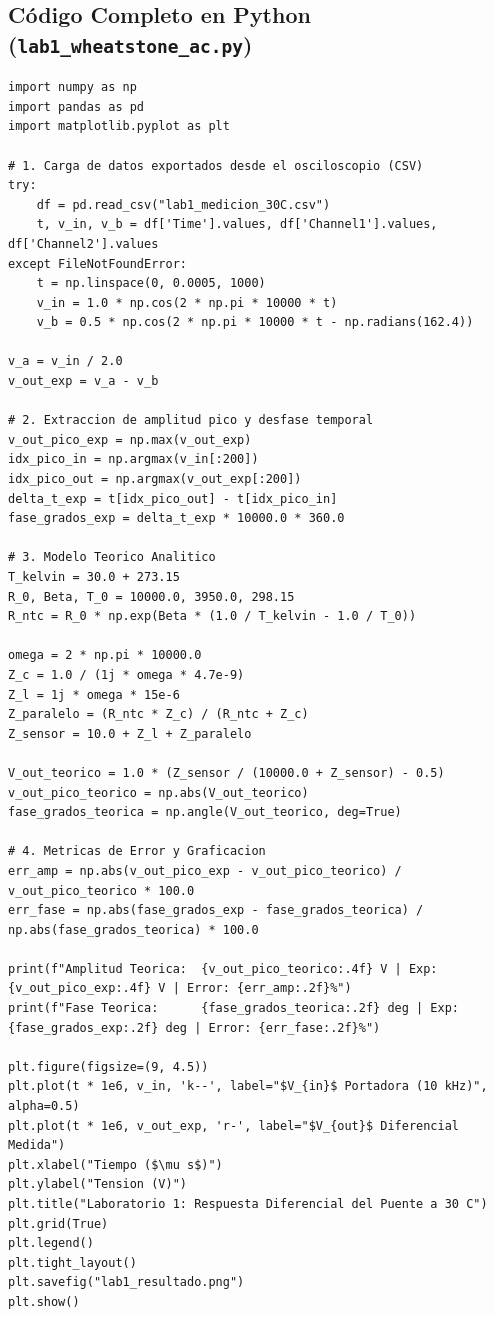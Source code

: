 \documentclass[10pt,a4paper,twoside]{article}
\begin{document}
\subsection{Código Completo en Python (\texttt{lab1\_wheatstone\_ac.py})}
\begin{lstlisting}
import numpy as np
import pandas as pd
import matplotlib.pyplot as plt

# 1. Carga de datos exportados desde el osciloscopio (CSV)
try:
    df = pd.read_csv("lab1_medicion_30C.csv")
    t, v_in, v_b = df['Time'].values, df['Channel1'].values, df['Channel2'].values
except FileNotFoundError:
    t = np.linspace(0, 0.0005, 1000)
    v_in = 1.0 * np.cos(2 * np.pi * 10000 * t)
    v_b = 0.5 * np.cos(2 * np.pi * 10000 * t - np.radians(162.4))

v_a = v_in / 2.0
v_out_exp = v_a - v_b

# 2. Extraccion de amplitud pico y desfase temporal
v_out_pico_exp = np.max(v_out_exp)
idx_pico_in = np.argmax(v_in[:200])
idx_pico_out = np.argmax(v_out_exp[:200])
delta_t_exp = t[idx_pico_out] - t[idx_pico_in]
fase_grados_exp = delta_t_exp * 10000.0 * 360.0

# 3. Modelo Teorico Analitico
T_kelvin = 30.0 + 273.15
R_0, Beta, T_0 = 10000.0, 3950.0, 298.15
R_ntc = R_0 * np.exp(Beta * (1.0 / T_kelvin - 1.0 / T_0))

omega = 2 * np.pi * 10000.0
Z_c = 1.0 / (1j * omega * 4.7e-9)
Z_l = 1j * omega * 15e-6
Z_paralelo = (R_ntc * Z_c) / (R_ntc + Z_c)
Z_sensor = 10.0 + Z_l + Z_paralelo

V_out_teorico = 1.0 * (Z_sensor / (10000.0 + Z_sensor) - 0.5)
v_out_pico_teorico = np.abs(V_out_teorico)
fase_grados_teorica = np.angle(V_out_teorico, deg=True)

# 4. Metricas de Error y Graficacion
err_amp = np.abs(v_out_pico_exp - v_out_pico_teorico) / v_out_pico_teorico * 100.0
err_fase = np.abs(fase_grados_exp - fase_grados_teorica) / np.abs(fase_grados_teorica) * 100.0

print(f"Amplitud Teorica:  {v_out_pico_teorico:.4f} V | Exp: {v_out_pico_exp:.4f} V | Error: {err_amp:.2f}%")
print(f"Fase Teorica:      {fase_grados_teorica:.2f} deg | Exp: {fase_grados_exp:.2f} deg | Error: {err_fase:.2f}%")

plt.figure(figsize=(9, 4.5))
plt.plot(t * 1e6, v_in, 'k--', label="$V_{in}$ Portadora (10 kHz)", alpha=0.5)
plt.plot(t * 1e6, v_out_exp, 'r-', label="$V_{out}$ Diferencial Medida")
plt.xlabel("Tiempo ($\mu s$)")
plt.ylabel("Tension (V)")
plt.title("Laboratorio 1: Respuesta Diferencial del Puente a 30 C")
plt.grid(True)
plt.legend()
plt.tight_layout()
plt.savefig("lab1_resultado.png")
plt.show()
\end{lstlisting}
\end{document}

